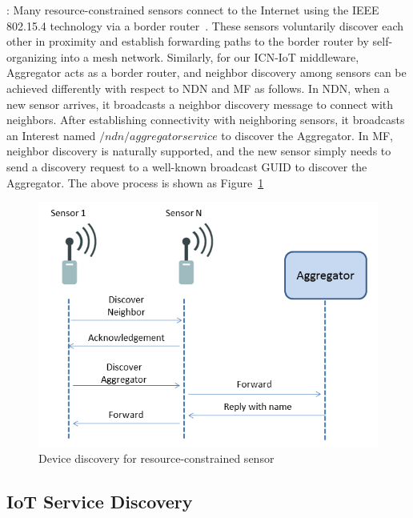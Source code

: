 \vspace{1mm}: Many resource-constrained sensors connect to the Internet using the IEEE 802.15.4 technology via a border router~\cite{hui2008ip}. These sensors voluntarily discover each other in proximity and establish forwarding paths to the border router by self-organizing into a mesh network. Similarly, for our ICN-IoT middleware,  Aggregator acts as a border router, and neighbor discovery among sensors can be achieved differently with respect to NDN and MF as follows. In NDN, when a new sensor arrives, it broadcasts a neighbor discovery message to connect with neighbors. After establishing connectivity with neighboring sensors, it broadcasts an Interest named $/ndn/aggregatorservice$ to discover the Aggregator. In MF, neighbor discovery is naturally supported, and the new sensor simply needs to send a discovery request to a well-known broadcast GUID to discover the Aggregator. %
The above process is shown as Figure~\ref{fig:device_dis}
\begin{figure}
\includegraphics[width=\columnwidth]{figure/device_discovery.png}
\caption{\label{fig:device_dis}Device discovery for resource-constrained sensor}
\end{figure}



\subsection{IoT Service Discovery}

